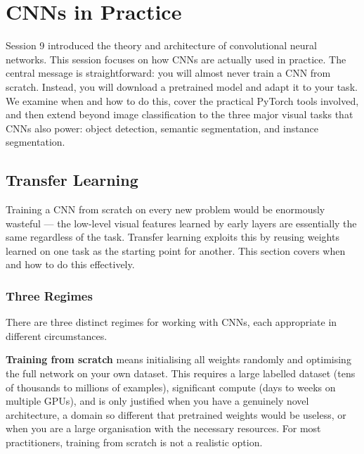 \section{CNNs in Practice}\label{sec:transfer}

Session 9 introduced the theory and architecture of convolutional neural networks. This session focuses on how CNNs are actually used in practice. The central message is straightforward: you will almost never train a CNN from scratch. Instead, you will download a pretrained model and adapt it to your task. We examine when and how to do this, cover the practical PyTorch tools involved, and then extend beyond image classification to the three major visual tasks that CNNs also power: object detection, semantic segmentation, and instance segmentation.

\subsection{Transfer Learning}

Training a CNN from scratch on every new problem would be enormously wasteful — the low-level visual features learned by early layers are essentially the same regardless of the task. Transfer learning exploits this by reusing weights learned on one task as the starting point for another. This section covers when and how to do this effectively.

\subsubsection{Three Regimes}

There are three distinct regimes for working with CNNs, each appropriate in different circumstances.

\textbf{Training from scratch} means initialising all weights randomly and optimising the full network on your own dataset. This requires a large labelled dataset (tens of thousands to millions of examples), significant compute (days to weeks on multiple GPUs), and is only justified when you have a genuinely novel architecture, a domain so different that pretrained weights would be useless, or when you are a large organisation with the necessary resources. For most practitioners, training from scratch is not a realistic option.

